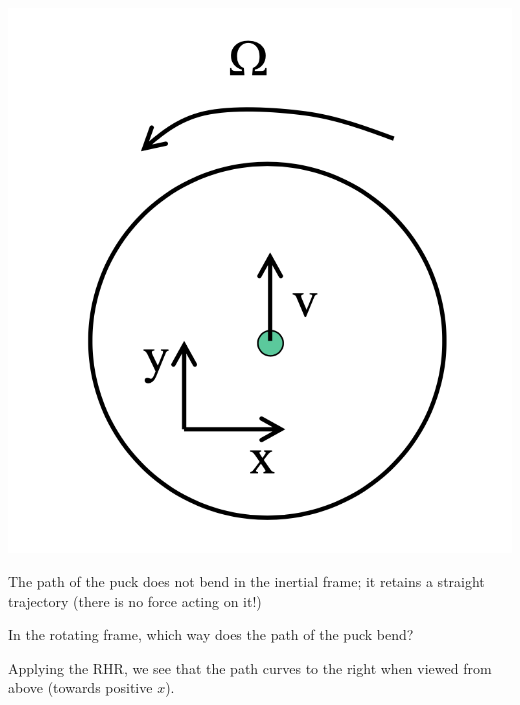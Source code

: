 \documentclass[../PHYS306Notes.tex]{subfiles}
\begin{document}
\begin{center}
    \includegraphics[scale=0.3]{Lecture-15/w15-img3.png}
\end{center}
\begin{s}
The path of the puck does not bend in the inertial frame; it retains a straight trajectory (there is no force acting on it!)
\end{s}
\noindent In the rotating frame, which way does the path of the puck bend?
\begin{s}
Applying the RHR, we see that the path curves to the right when viewed from above (towards positive $x$).
\end{s}
\end{document}
